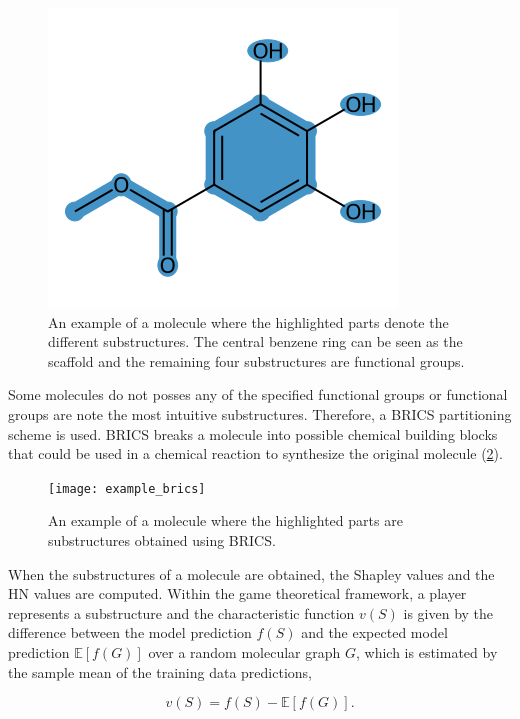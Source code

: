 \begin{figure}[h]
    \centering
    \includegraphics[scale=0.5]{../../data/images/example_functional_groups.png}
    \caption{An example of a molecule where the highlighted parts denote the different substructures. 
    The central benzene ring can be seen as the scaffold and the remaining four substructures are 
functional groups.}
    \label{fig:example_functional_groups}
\end{figure}


Some molecules do not posses any of the specified functional groups or functional 
groups are note the most intuitive substructures. Therefore, a BRICS\cite{degen2008art} 
partitioning scheme is used. BRICS breaks a molecule into possible 
chemical building blocks that could be used in a chemical reaction to synthesize the original 
molecule (\cref{fig:example_brices}).


\begin{figure}[h]
    \centering
    \texttt{[image: example\_brics]}
    \caption{An example of a molecule where the highlighted parts are substructures obtained using BRICS.}
    \label{fig:example_brices}
\end{figure}

When the substructures of a molecule are obtained, the Shapley values and the HN values are 
computed. Within the game theoretical framework, a player represents a substructure and the 
characteristic function $v(S)$ is given by the difference between the model prediction $f(S)$ and 
the expected model prediction $\mathbb{E}[f(G)]$ over a random molecular graph $G$, which 
is estimated by the sample mean of the training data predictions,


\begin{equation}
    v(S) = f(S) - \mathbb{E}[f(G)].
\end{equation}


